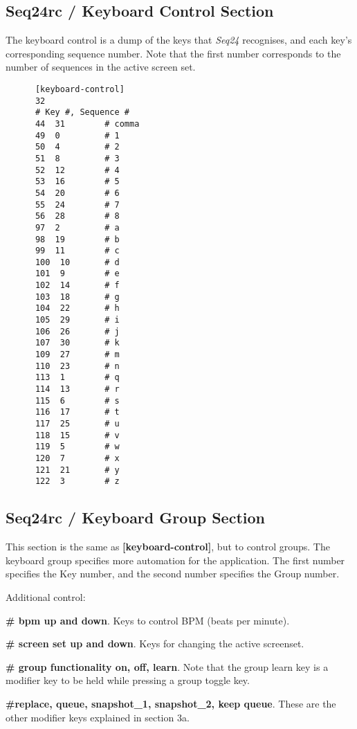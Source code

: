 \subsection{Seq24rc / Keyboard Control Section}
\label{subsec:seq24_rc_file_keyboard_control}
        
   The keyboard control is a dump of the keys that \textsl{Seq24}
   recognises, and each key's corresponding sequence number.
   Note that the first number corresponds to the number of sequences in
   the active screen set.

   \begin{verbatim}
      [keyboard-control]
      32
      # Key #, Sequence # 
      44  31        # comma
      49  0         # 1
      50  4         # 2
      51  8         # 3
      52  12        # 4
      53  16        # 5
      54  20        # 6
      55  24        # 7
      56  28        # 8
      97  2         # a
      98  19        # b
      99  11        # c
      100  10       # d
      101  9        # e
      102  14       # f
      103  18       # g
      104  22       # h
      105  29       # i
      106  26       # j
      107  30       # k
      109  27       # m
      110  23       # n
      113  1        # q
      114  13       # r
      115  6        # s
      116  17       # t
      117  25       # u
      118  15       # v
      119  5        # w
      120  7        # x
      121  21       # y
      122  3        # z
   \end{verbatim}

\subsection{Seq24rc / Keyboard Group Section}
\label{subsec:seq24_rc_file_keyboard_group}

   This section is the same as
   \textbf{[keyboard-control]}, but to control groups.
   The keyboard group specifies more automation for the application.  The
   first number specifies the Key number, and the second number specifies
   the Group number.

   Additional control:

   \begin{enumber}
   	\item \textbf{\# bpm up and down}.
	      Keys to control BPM (beats per minute).
      \item \textbf{\# screen set up and down}.
	      Keys for changing the active screenset.
      \item \textbf{\# group functionality on, off, learn}.
	      Note that the group learn key is a modifier key to be held while 
         pressing a group toggle key.
      \item \textbf{\#replace, queue, snapshot\_1, snapshot\_2, keep queue}.
         These are the other modifier keys explained in section 3a.
   \end{enumber}

